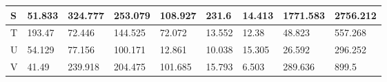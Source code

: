 \begin{landscape}
\begin{longtable}[c]{|l|llllllll|}
    S                                                                               & \multicolumn{1}{l|}{51.833}                                                         & \multicolumn{1}{l|}{324.777}                                                        & \multicolumn{1}{l|}{253.079}                                                        & \multicolumn{1}{l|}{108.927}                                                        & \multicolumn{1}{l|}{231.6}                                     & \multicolumn{1}{l|}{14.413}                                    & \multicolumn{1}{l|}{1771.583}                                      & 2756.212                                                                               \\ \hline
    T                                                                               & \multicolumn{1}{l|}{193.47}                                                         & \multicolumn{1}{l|}{72.446}                                                         & \multicolumn{1}{l|}{144.525}                                                        & \multicolumn{1}{l|}{72.072}                                                         & \multicolumn{1}{l|}{13.552}                                    & \multicolumn{1}{l|}{12.38}                                     & \multicolumn{1}{l|}{48.823}                                        & 557.268                                                                                \\ \hline
    U                                                                               & \multicolumn{1}{l|}{54.129}                                                         & \multicolumn{1}{l|}{77.156}                                                         & \multicolumn{1}{l|}{100.171}                                                        & \multicolumn{1}{l|}{12.861}                                                         & \multicolumn{1}{l|}{10.038}                                    & \multicolumn{1}{l|}{15.305}                                    & \multicolumn{1}{l|}{26.592}                                        & 296.252                                                                                \\ \hline
    V                                                                               & \multicolumn{1}{l|}{41.49}                                                          & \multicolumn{1}{l|}{239.918}                                                        & \multicolumn{1}{l|}{204.475}                                                        & \multicolumn{1}{l|}{101.685}                                                        & \multicolumn{1}{l|}{15.793}                                    & \multicolumn{1}{l|}{6.503}                                     & \multicolumn{1}{l|}{289.636}                                       & 899.5                                                                                  \\ \hline

\end{longtable}
\end{landscape}
